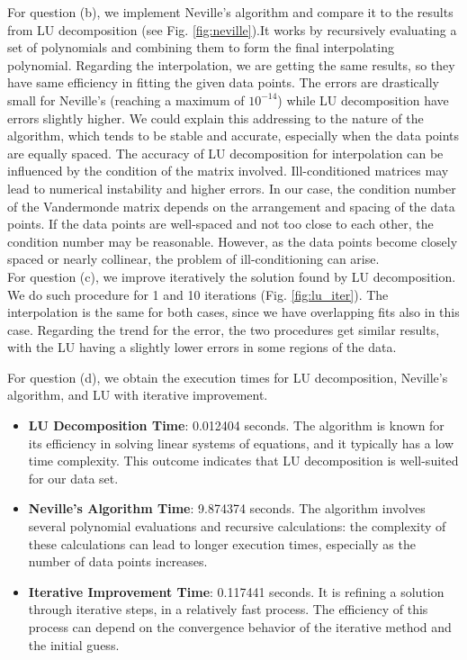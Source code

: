 For question (b), we implement Neville's algorithm and compare it to the results from LU decomposition (see Fig. \ref{fig:neville}).It works by recursively evaluating a set of polynomials and combining them to form the final interpolating polynomial. Regarding the interpolation, we are getting the same results, so they have same efficiency in fitting the given data points. The errors are drastically small for Neville's (reaching a maximum of $10^{-14}$) while LU decomposition have errors slightly higher. We could explain this addressing to the nature of the algorithm, which tends to be stable and accurate, especially when the data points are equally spaced. The accuracy of LU decomposition for interpolation can be influenced by the condition of the matrix involved. Ill-conditioned matrices may lead to numerical instability and higher errors. In our case, the condition number of the Vandermonde matrix depends on the arrangement and spacing of the data points. If the data points are well-spaced and not too close to each other, the condition number may be reasonable. However, as the data points become closely spaced or nearly collinear, the problem of ill-conditioning can arise. \\

For question (c), we improve iteratively the solution found by LU decomposition. We do such procedure for 1 and 10 iterations (Fig. \ref{fig:lu_iter}).
The interpolation is the same for both cases, since we have overlapping fits also in this case. Regarding the trend for the error, the two procedures get similar results, with the LU having a slightly lower errors in some regions of the data.

For question (d), we obtain the execution times for LU decomposition, Neville's algorithm, and LU with iterative improvement. 
\begin{itemize}
    \item \textbf{LU Decomposition Time}: 0.012404 seconds. The algorithm is known for its efficiency in solving linear systems of equations, and it typically has a low time complexity. This outcome indicates that LU decomposition is well-suited for our data set.

    \item \textbf{Neville's Algorithm Time}: 9.874374 seconds. The algorithm involves several polynomial evaluations and recursive calculations: the complexity of these calculations can lead to longer execution times, especially as the number of data points increases.
    
    \item \textbf{Iterative Improvement Time}: 0.117441 seconds. It is refining a solution through iterative steps, in a relatively fast process. The efficiency of this process can depend on the convergence behavior of the iterative method and the initial guess.
    
\end{itemize}
 
